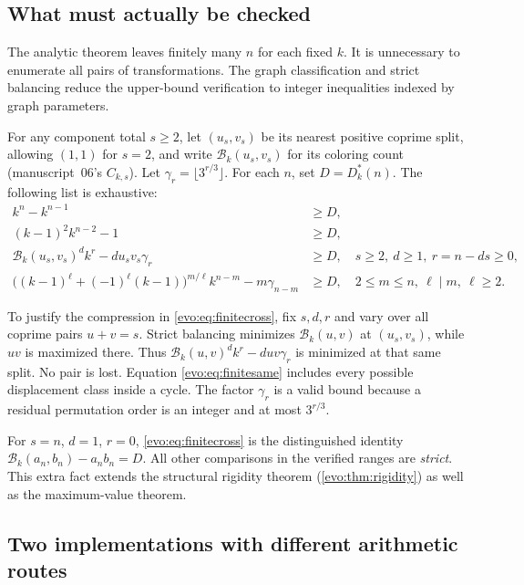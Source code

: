 \documentclass[11pt,a4paper]{article}
\numberwithin{equation}{section}
\theoremstyle{definition}
\theoremstyle{remark}
\newcommand{\Bip}{\mathcal B}
\begin{document}
\subsection{What must actually be checked}

The analytic theorem leaves finitely many $n$ for each fixed $k$. It is
unnecessary to enumerate all pairs of transformations. The graph
classification and strict balancing reduce the upper-bound verification to
integer inequalities indexed by graph parameters.

For any component total $s\ge2$, let $(u_s,v_s)$ be its nearest positive
coprime split, allowing $(1,1)$ for $s=2$, and write
$\Bip_k(u_s,v_s)$ for its coloring count (manuscript~06's $C_{k,s}$). Let
$\gamma_r=\lfloor3^{r/3}\rfloor$. For each $n$, set $D=D^*_k(n)$. The
following list is exhaustive:
\begin{align}
 k^n-k^{n-1}&\ge D,
 \label{evo:eq:finiteperm}\\
 (k-1)^2k^{n-2}-1&\ge D,
 \label{evo:eq:finitesing}\\
 \Bip_k(u_s,v_s)^{d}k^r-du_sv_s\gamma_r&\ge D,
 \quad s\ge2,\ d\ge1,\ r=n-ds\ge0,
 \label{evo:eq:finitecross}\\
 \bigl((k-1)^\ell+(-1)^\ell(k-1)\bigr)^{m/\ell}k^{n-m}-m\gamma_{n-m}&\ge D,
 \quad 2\le m\le n,\ \ell\mid m,\ \ell\ge2.
 \label{evo:eq:finitesame}
\end{align}

To justify the compression in \eqref{evo:eq:finitecross}, fix $s,d,r$ and
vary over all coprime pairs $u+v=s$. Strict balancing minimizes
$\Bip_k(u,v)$ at $(u_s,v_s)$, while $uv$ is maximized there. Thus
$\Bip_k(u,v)^dk^r-duv\gamma_r$ is minimized at that same split. No pair is
lost. Equation \eqref{evo:eq:finitesame} includes every possible displacement
class inside a cycle. The factor $\gamma_r$ is a valid bound because a
residual permutation order is an integer and at most $3^{r/3}$.

For $s=n$, $d=1$, $r=0$, \eqref{evo:eq:finitecross} is the distinguished
identity $\Bip_k(a_n,b_n)-a_nb_n=D$. All other comparisons in the verified
ranges are \emph{strict}. This extra fact extends the structural rigidity
theorem (\cref{evo:thm:rigidity}) as well as the maximum-value theorem.

\subsection{Two implementations with different arithmetic routes}
\end{document}
